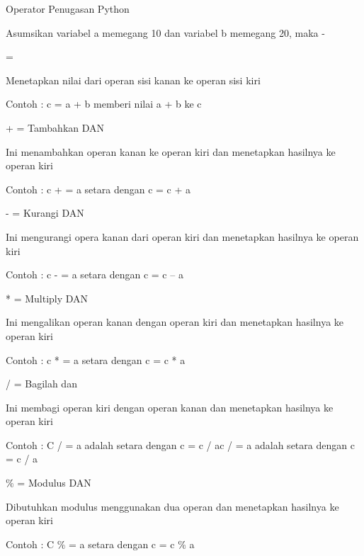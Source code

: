 \vspace{12pt}
\noindent
Operator Penugasan Python \par
\vspace{12pt}
\noindent
Asumsikan variabel a memegang 10 dan variabel b memegang 20, maka - \par
\vspace{12pt}
\noindent
= \par
\noindent
Menetapkan nilai dari operan sisi kanan ke operan sisi kiri \hspace*{4.41in}  \par
\noindent
Contoh : c = a + b memberi nilai a + b ke c \par
\noindent
\vspace{12pt}
\noindent
+ = Tambahkan DAN \par
\noindent
Ini menambahkan operan kanan ke operan kiri dan menetapkan hasilnya ke operan kiri \par
\noindent
Contoh : c + = a setara dengan c = c + a \par
\noindent
\vspace{12pt}
\noindent
- = Kurangi DAN \par
\noindent
Ini mengurangi opera kanan dari operan kiri dan menetapkan hasilnya ke operan kiri \par
\noindent
Contoh : c - = a setara dengan c = c – a \par
\noindent
\vspace{12pt}
\noindent
* = Multiply DAN \par
\noindent
Ini mengalikan operan kanan dengan operan kiri dan menetapkan hasilnya ke operan kiri \par
\noindent
Contoh : c * = a setara dengan c = c * a \par
\noindent
\vspace{12pt}
\noindent
/ = Bagilah dan \par
\noindent
Ini membagi operan kiri dengan operan kanan dan menetapkan hasilnya ke operan kiri \par
\noindent
Contoh : C / = a adalah setara dengan c = c / ac / = a adalah setara dengan c = c / a \par
\noindent
\vspace{12pt}
\noindent
 $  \%  $ = Modulus DAN \par
\noindent
Dibutuhkan modulus menggunakan dua operan dan menetapkan hasilnya ke operan kiri \par
\noindent
Contoh : C $  \%  $ = a setara dengan c = c $  \%  $ a \par
